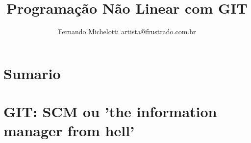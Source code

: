 \documentclass{beamer}
\author{Fernando Michelotti {artista@frustrado.com.br}}
\title{Programação Não Linear com GIT}
\begin{document}
\frame{\titlepage}
\section{Sumario}

\frame{\tableofcontents}

\section{GIT: SCM ou 'the information manager from hell'}














\end{document}
